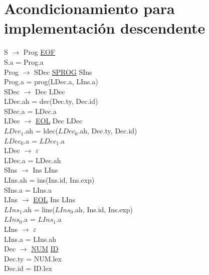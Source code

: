 \documentclass[\main/MemoriaPL.tex]{subfiles}
\begin{document}
  \section{Acondicionamiento para implementación descendente}
    S $\rightarrow$ Prog \underline{EOF}\\
    \hspace{5mm}S.a = Prog.a\\
    Prog $\rightarrow$ SDec \underline{SPROG} SIns\\
    \hspace{5mm}Prog.a = prog(LDec.a, LIns.a)\\
    SDec $\rightarrow$ Dec LDec\\
    \hspace{5mm}LDec.ah = dec(Dec.ty, Dec.id)\\
    \hspace{5mm}SDec.a = LDec.a\\
    LDec $\rightarrow$ \underline{EOL} Dec LDec\\
    \hspace{5mm}$LDec_1$.ah = ldec($LDec_0$.ah, Dec.ty, Dec.id)\\
    \hspace{5mm}$LDec_0$.a = $LDec_1$.a\\
    LDec $\rightarrow$ $\varepsilon$\\
    \hspace{5mm}LDec.a = LDec.ah\\
    SIns $\rightarrow$ Ins LIns\\
    \hspace{5mm}LIns.ah = ins(Ins.id, Ins.exp)\\
    \hspace{5mm}SIns.a = LIns.a\\
    LIns $\rightarrow$ \underline{EOL} Ins LIns\\
    \hspace{5mm}$LIns_1$.ah = lins($LIns_0$.ah, Ins.id, Ins.exp)\\
    \hspace{5mm}$LIns_0$.a = $LIns_1$.a\\
    LIns $\rightarrow$ $\varepsilon$\\
    \hspace{5mm}LIns.a = LIns.ah\\
    Dec $\rightarrow$ \underline{NUM} \underline{ID}\\
    \hspace{5mm}Dec.ty = NUM.lex\\
    \hspace{5mm}Dec.id = ID.lex\\
\end{document}
